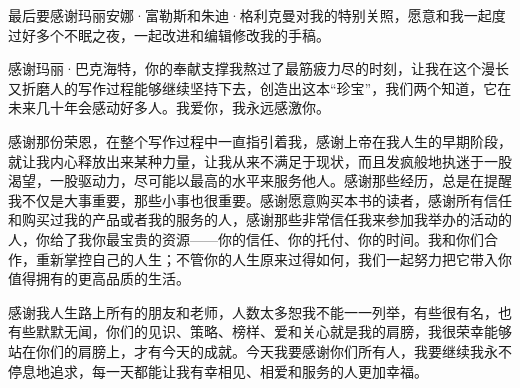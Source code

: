 最后要感谢玛丽安娜·富勒斯和朱迪·格利克曼对我的特别关照，愿意和我一起度过好多个不眠之夜，一起改进和编辑修改我的手稿。

感谢玛丽·巴克海特，你的奉献支撑我熬过了最筋疲力尽的时刻，让我在这个漫长又折磨人的写作过程能够继续坚持下去，创造出这本“珍宝”，我们两个知道，它在未来几十年会感动好多人。我爱你，我永远感激你。

感谢那份荣恩，在整个写作过程中一直指引着我，感谢上帝在我人生的早期阶段，就让我内心释放出来某种力量，让我从来不满足于现状，而且发疯般地执迷于一股渴望，一股驱动力，尽可能以最高的水平来服务他人。感谢那些经历，总是在提醒我不仅是大事重要，那些小事也很重要。感谢愿意购买本书的读者，感谢所有信任和购买过我的产品或者我的服务的人，感谢那些非常信任我来参加我举办的活动的人，你给了我你最宝贵的资源——你的信任、你的托付、你的时间。我和你们合作，重新掌控自己的人生；不管你的人生原来过得如何，我们一起努力把它带入你值得拥有的更高品质的生活。

感谢我人生路上所有的朋友和老师，人数太多恕我不能一一列举，有些很有名，也有些默默无闻，你们的见识、策略、榜样、爱和关心就是我的肩膀，我很荣幸能够站在你们的肩膀上，才有今天的成就。今天我要感谢你们所有人，我要继续我永不停息地追求，每一天都能让我有幸相见、相爱和服务的人更加幸福。
